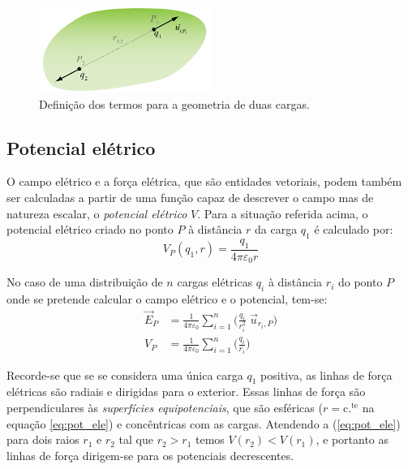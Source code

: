 \documentclass[12pt,a4paper,oneside]{paper}
\begin{document}
\begin{figure}[H]
  \centering 
	\includegraphics[width=0.5\textwidth]{./thomson_images/fig1-thomson} 
	\caption{ Definição dos termos para a geometria de duas cargas. \label{fig:fig1}} 

\end{figure}


\subsection{Potencial elétrico}
	
O campo elétrico e a força elétrica, que são entidades vetoriais, podem também ser calculadas a partir de uma função capaz de descrever o campo mas de natureza escalar, o \emph{potencial elétrico} $V$. Para a situação referida acima, o potencial elétrico criado no ponto $P$ à distância $r$ da carga $q_1$ é calculado por:
\begin{equation} \label{eq:pot_ele}
	V_P (q_1, r) = \frac{q_1}{4 \pi \varepsilon_0 r} 
\end{equation}


No caso de uma distribuição de $n$ cargas elétricas $q_i$ à distância $r_i$ do ponto $P$ onde se pretende calcular o campo elétrico e o potencial, tem-se:
\begin{align}
	\vec{E}_P &= \frac{1}{4 \pi \varepsilon_0 } \sum_{i=1}^n \Big( \frac{q_i}{ r_i^2}\; \vec{u}_{r_i , P}  \Big) \nonumber \\ 
 V_P &= \frac{1}{4 \pi \varepsilon_0 } \sum_{i=1}^n \Big( \frac{q_i}{ r_i}  \Big) \nonumber
\end{align}

Recorde-se que se se considera uma única carga $q_1$ positiva, as linhas de força elétricas são radiais e dirigidas para
o exterior. Essas linhas de força são perpendiculares às \emph{superfícies equipotenciais}, que são esféricas
($r = \mathrm{c.^{te}}$ na equação \ref{eq:pot_ele}) e concêntricas com as cargas. Atendendo a (\ref{eq:pot_ele}) para
dois raios $r_1$ e $r_2$ tal que $r_2 > r_1$ temos $V(r_2) < V(r_1)$, e portanto as linhas de força dirigem-se para os
potenciais decrescentes.
\end{document}
